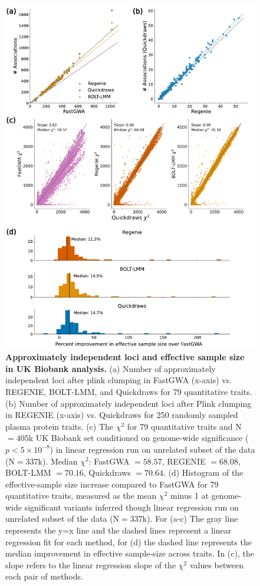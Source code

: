 \begin{figure}[h!]
    \centering
    \includegraphics[scale=0.7]{figures/qd_panel_loci.pdf}
    \caption{\textbf{Approximately independent loci and effective sample size in UK Biobank analysis.} (a) Number of approximately independent loci after plink clumping in FastGWA (x-axis) vs. REGENIE, BOLT-LMM, and Quickdraws for 79 quantitative traits. (b) Number of approximately independent loci after Plink clumping in REGENIE (x-axis) vs. Quickdraws for 250 randomly sampled plasma protein traits. (c) The $\chi^2$ for 79 quantitative traits and N$=405$k UK Biobank set conditioned on genome-wide significance ($p < 5 \times 10^{-8}$) in linear regression run on unrelated subset of the data (N$=337$k). Median $\chi^2$: FastGWA $= 58.57$, REGENIE $= 68.08$, BOLT-LMM $= 70.16$, Quickdraws $= 70.64$. (d) Histogram of the effective-sample size increase compared to FastGWA for 79 quantitative traits, measured as the mean $\chi^2$ minus 1 at genome-wide significant variants inferred though linear regression run on unrelated subset of the data (N$=337$k). For (a-c) The gray line represents the y=x line and the dashed lines represent a linear regression fit for each method, for (d) the dashed line represents the median improvement in effective sample-size across traits. In (c), the slope refers to the linear regression slope of the $\chi^2$ values between each pair of methods.}
    \label{fig:ukb_indep}
\end{figure}

